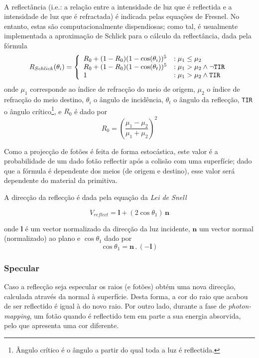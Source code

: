 \documentclass[a4paper]{article}
\begin{document}
\hfill \\
\indent A reflectância (i.e.: a relação entre a intensidade de luz que é reflectida e a intensidade de luz que é refractada) é indicada pelas equações de Fresnel.
No entanto, estas são computacionalmente dispendiosas; como tal, é usualmente implementada a aproximação de Schlick para o cálculo da reflectância,
dada pela fórmula
\begin{displaymath}
	R_{Schlick}(\theta_{i}) = \left\{
		\begin{array}{ll}
			R_{0} + (1 - R_{0}) (1 - \cos(\theta_{i}))^{5} & : \mu_{1} \leq \mu_{2} \\
			R_{0} + (1 - R_{0}) (1 - \cos(\theta_{t}))^{5} & : \mu_{1} > \mu_{2} \wedge \neg \text{\texttt{TIR}} \\
			1 & : \mu_{1} > \mu_{2} \wedge \text{\texttt{TIR}}
		\end{array}
	\right.
\end{displaymath}
onde $\mu_{1}$ corresponde ao índice de refracção do meio de origem, $\mu_{2}$ o índice de refracção do meio destino, $\theta_{i}$ o ângulo de incidência,
$\theta_{t}$ o ângulo da reflecção, \texttt{TIR} o ângulo crítico\footnote{Ângulo crítico é o ângulo a partir do qual toda a luz é reflectida.}, e $R_{0}$ é dado por
\begin{displaymath}
	R_{0} = \left(\frac{\mu_{1} - \mu_{2}}{\mu_{1} + \mu_{2}}\right)^2
\end{displaymath}

Como a projecção de fotões é feita de forma estocástica, este valor é a probabilidade de um dado fotão reflectir após a colisão com uma superfície;
dado que a fórmula é dependente dos meios (de origem e destino), esse valor será dependente do material da primitiva.

\cleardoublepage

A direcção da reflecção é dada pela equação da \textit{Lei de Snell}

\begin{displaymath}
	V_{reflect} = \mathbf{l} + (2 \cos{\theta_{1}}) \, \mathbf{n}
\end{displaymath}

onde $\mathbf{l}$ é um vector normalizado da direcção da luz incidente, $\mathbf{n}$ um vector normal (normalizado) ao plano e $\cos{\theta_{1}}$ dado por
\begin{displaymath}
	\cos{\theta_{1}} = \mathbf{n} \, . \, (\mathbf{-l})
\end{displaymath}

\subsubsection{Specular}
\indent \indent Caso a reflecção seja especular os raios (e fotões) obtém uma nova direcção,
calculada através da normal à superfície. Desta forma, a cor do raio que acabou de ser reflectido é igual à do novo raio.
Por outro lado, durante a fase de \emph{photon-mapping}, um fotão quando é reflectido tem em parte a sua energia absorvida, pelo que apresenta uma cor diferente.
\end{document}
